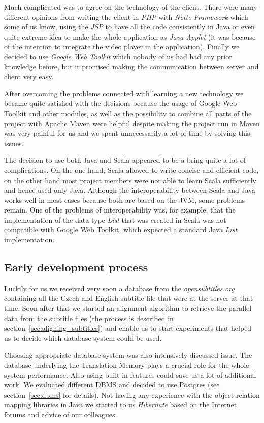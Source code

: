 Much complicated was to agree on the technology of the client. There were many different opinions from writing the client in {\it PHP} with {\it Nette Framework} which some of us know, using the {\it JSP} to have all the code consistently in Java or even quite extreme idea to make the whole application as {\it Java Applet} (it was because of the intention to integrate the video player in the application). Finally we decided to use {\it Google Web Toolkit} which nobody of us had had any prior knowledge before, but it promised making the communication between server and client very easy.

After overcoming the problems connected with learning a new technology we became quite satisfied with the decisions because the usage of Google Web Toolkit and other modules, as well as the possibility to combine all parts of the project with Apache Maven were helpful despite making the project run in Maven was very painful for us and we spent unnecessarily a lot of time by solving this issues.
	
The decision to use both Java and Scala appeared to be a bring quite a lot of complications. On the one hand, Scala allowed to write concise and efficient code, on the other hand most project members were not able to learn Scala sufficiently and hence used only Java. Although the interoperability between Scala and Java works well in most cases because both are based on the JVM, some problems remain. One of the problems of interoperability was, for example, that the implementation of the data type \emph{List} that was created in Scala was not compatible with Google Web Toolkit, which expected a standard Java \emph{List} implementation.

\subsection{Early development process}

Luckily for us we received very soon a database from the {\it opensubtitles.org} containing all the Czech and English subtitle file that were at the server at that time. Soon after that we started an alignment algorithm to retrieve the parallel data from the subtitle files (the process is described in section~\ref{sec:aligning_subtitles}) and enable us to start experiments that helped us to decide which database system could be used.

Choosing appropriate database system was also intensively discussed issue. The database underlying the Translation Memory plays a crucial role for the whole system performance. Also using built-in features could save us a lot of additional work.  We evaluated different DBMS and decided to use Postgres (see section~\ref{sec:dbms} for details). Not having any experience with the object-relation mapping libraries in Java we started to us {\it Hibernate} based on the Internet forums and advice of our colleagues.

